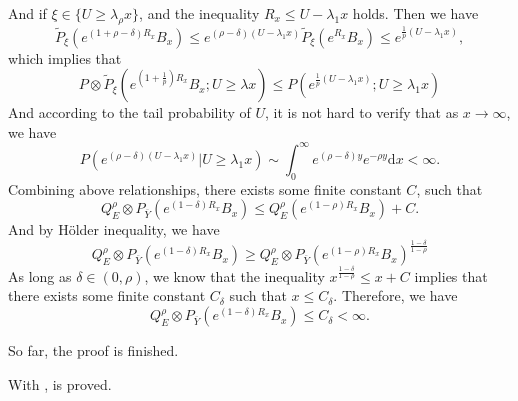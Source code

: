 \documentclass[]{article}
\makeatletter
\numberwithin{equation}{section}
\renewenvironment{proof}[1][\proofname]{%
	\par\pushQED{\qed}\normalfont%
	\topsep6\p@\@plus6\p@\relax
	\trivlist\item[\hskip\labelsep\bfseries#1\@addpunct{.}]%
	\ignorespaces
}{%
	\popQED\endtrivlist\@endpefalse
}
\theoremstyle{thmstyleone}%
\theoremstyle{thmstyletwo}%
\theoremstyle{thmstylethree}%
\theoremstyle{thmstylefour}%
\theoremstyle{thmstylefive}%
\theoremstyle{thmstylesix}%
\renewcommand{\d}{\mathrm{d}}
\makeatother
\begin{document}
\begin{proof}[Proof of \Cref{lemma of weakly 2}]
	And if $\xi\in \{U\geqslant \lambda_\rho x\}$, and the inequality $R_x\leqslant U-\lambda_1 x$ holds. Then we have
	\begin{equation*}
		\tilde{P}_\xi(e^{(1+\rho-\delta)R_x}B_x)
		\leqslant e^{(\rho-\delta)(U-\lambda_1x)}
		\tilde{P}_\xi(e^{R_x}B_x)\leqslant e^{\frac{1}{p}(U-\lambda_1x)},
	\end{equation*}
	which implies that
	\begin{equation*}
		P\otimes \tilde{P}_\xi (e^{(1+\frac{1}{p})R_x}B_x;U\geqslant\lambda x)\leqslant
		P\left( e^{\frac{1}{p}(U-\lambda_1 x)};U\geqslant \lambda_1 x \right)
	\end{equation*}
	And according to the tail probability of $U$, it is not hard to verify that as $x\rightarrow\infty$, we have
	\begin{equation*}
		P\left( e^{(\rho-\delta)(U-\lambda_1 x)}|U\geqslant \lambda_1 x \right) \sim \int_{0}^{\infty} e^{(\rho-\delta)y} e^{-\rho y} \d x <\infty.
	\end{equation*}
	Combining above relationships, there exists some finite constant $C$, such that
	\begin{equation*}
		Q_E^{\rho}\otimes P_{\overline{Y}} \left(
		e^{(1-\delta)R_x} B_x
		\right)\leqslant Q_E^{\rho} \left(
		e^{(1-\rho)R_x} B_x
		\right) +C.
	\end{equation*}
	And by H\"older inequality, we have
	\begin{equation*}
		Q_E^{\rho}\otimes P_{\overline{Y}} \left(
		e^{(1-\delta)R_x} B_x
		\right)
		\geqslant
		Q_E^{\rho}\otimes P_{\overline{Y}} \left(
		e^{(1-\rho)R_x} B_x
		\right) ^{\frac{1-\delta}{1-\rho}}
	\end{equation*}
    As long as $\delta \in (0,\rho)$, we know that the inequality $x^{\frac{1-\delta}{1-\rho}}\leqslant x+C$ implies that there exists some finite constant $C_\delta$ such that $x\leqslant C_\delta$. Therefore, we have
    \begin{equation*}
    	Q_E^{\rho}\otimes P_{\overline{Y}} \left(
    	e^{(1-\delta)R_x} B_x
    	\right) \leqslant C_\delta<\infty.
    \end{equation*}
    
    So far, the proof is finished.
    \end{proof}
	
	\begin{proof}[Proof of \Cref{Theorem of weakly cases}]
		With ,  is proved.
	\end{proof}
	
\end{document}
